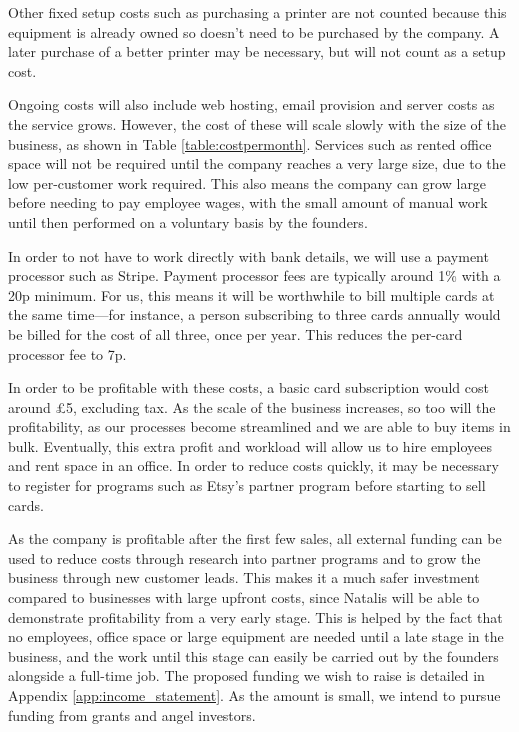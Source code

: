 \documentclass[10pt,a4paper]{article}
\begin{document}
Other fixed setup costs such as purchasing a printer are not counted because this equipment is already owned so doesn't need to be purchased by the company. A later purchase of a better printer may be necessary, but will not count as a setup cost.

Ongoing costs will also include web hosting, email provision and server costs as the service grows. However, the cost of these will scale slowly with the size of the business, as shown in Table \ref{table:costpermonth}. Services such as rented office space will not be required until the company reaches a very large size, due to the low per-customer work required. This also means the company can grow large before needing to pay employee wages, with the small amount of manual work until then performed on a voluntary basis by the founders.

In order to not have to work directly with bank details, we will use a payment processor such as Stripe. Payment processor fees are typically around 1\% with a 20p minimum. For us, this means it will be worthwhile to bill multiple cards at the same time---for instance, a person subscribing to three cards annually would be billed for the cost of all three, once per year. This reduces the per-card processor fee to 7p.

In order to be profitable with these costs, a basic card subscription would cost around £5, excluding tax. As the scale of the business increases, so too will the profitability, as our processes become streamlined and we are able to buy items in bulk. Eventually, this extra profit and workload will allow us to hire employees and rent space in an office. In order to reduce costs quickly, it may be necessary to register for programs such as Etsy's partner program before starting to sell cards.

As the company is profitable after the first few sales, all external funding can be used to reduce costs through research into partner programs and to grow the business through new customer leads. This makes it a much safer investment compared to businesses with large upfront costs, since Natalis will be able to demonstrate profitability from a very early stage. This is helped by the fact that no employees, office space or large equipment are needed until a late stage in the business, and the work until this stage can easily be carried out by the founders alongside a full-time job. The proposed funding we wish to raise is detailed in Appendix \ref{app:income_statement}. As the amount is small, we intend to pursue funding from grants and angel investors.
\end{document}
